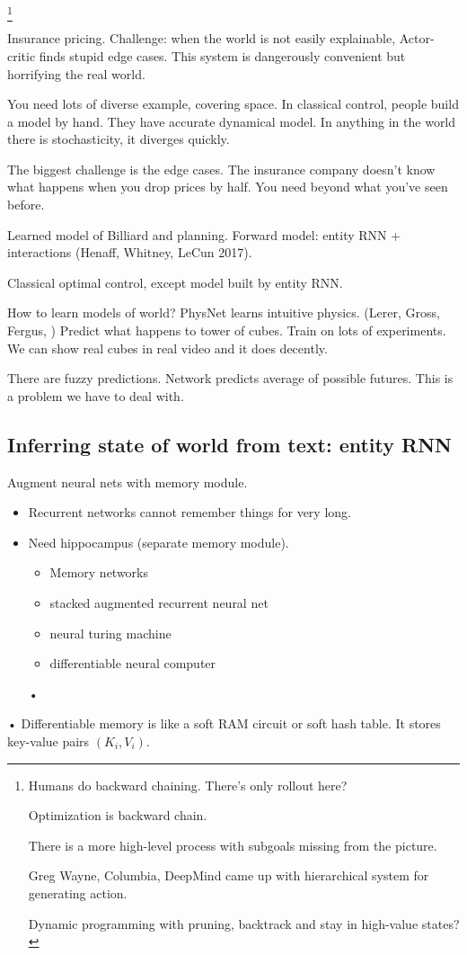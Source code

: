 \footnote{
Humans do backward chaining. There's only rollout here?

Optimization is backward chain.

There is a more high-level process with subgoals missing from the picture.

Greg Wayne, Columbia, DeepMind came up with hierarchical system for generating action.

Dynamic programming with pruning, backtrack and stay in high-value states?}

Insurance pricing. Challenge: when the world is not easily explainable, Actor-critic finds stupid edge cases. This system is dangerously convenient but horrifying the real world.

You need lots of diverse example, covering space. In classical control, people build a model by hand. They have accurate dynamical model. %
In anything in the world there is stochasticity, it diverges quickly. 

The biggest challenge is the edge cases. The insurance company doesn't know what happens when you drop prices by half. You need beyond what you've seen before.

Learned model of Billiard and planning. Forward model: entity RNN + interactions (Henaff, Whitney, LeCun 2017). 

Classical optimal control, except model built by entity RNN.

How to learn models of world? PhysNet learns intuitive physics. (Lerer, Gross, Fergus, ) Predict what happens to tower of cubes. Train on lots of experiments. We can show real cubes in real video and it does decently.

There are fuzzy predictions. Network predicts average of possible futures. This is a problem we have to deal with.

\subsection{Inferring state of world from text: entity RNN}
Augment neural nets with memory module. 
\begin{itemize}
\item
Recurrent networks cannot remember things for very long.
\item
Need hippocampus (separate memory module).
\begin{itemize}
\item
Memory networks
\item
stacked augmented recurrent neural net
\item
neural turing machine
\item
differentiable neural computer
\end{itemize}•
\end{itemize}•
Differentiable memory is like a soft RAM circuit or soft hash table. It stores key-value pairs $(K_i,V_i)$. 

